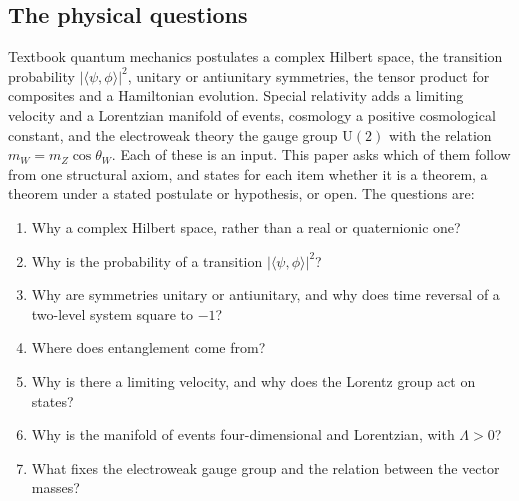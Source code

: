 \documentclass[aps,pra,onecolumn,superscriptaddress,nofootinbib,10pt]{revtex4-2}
\theoremstyle{definition}
\theoremstyle{remark}
\newcommand{\ip}[2]{\langle #1,#2\rangle}
\newcommand{\U}{\mathrm{U}}
\begin{document}
\subsection{The physical questions}
Textbook quantum mechanics postulates a complex Hilbert space, the transition probability
$\lvert\ip{\psi}{\phi}\rvert^2$, unitary or antiunitary symmetries, the tensor product for composites
and a Hamiltonian evolution.  Special relativity adds a limiting velocity and a Lorentzian manifold
of events, cosmology a positive cosmological constant, and the electroweak theory the gauge group
$\U(2)$ with the relation $m_W=m_Z\cos\theta_W$.  Each of these is an input.  This paper asks which of
them follow from one structural axiom, and states for each item whether it is a theorem, a theorem
under a stated postulate or hypothesis, or open.  The questions are:
\begin{enumerate}[label=(Q\arabic*),leftmargin=3em]
\item Why a complex Hilbert space, rather than a real or quaternionic one?
\item Why is the probability of a transition $\lvert\ip{\psi}{\phi}\rvert^2$?
\item Why are symmetries unitary or antiunitary, and why does time reversal of a two-level system
square to $-1$?
\item Where does entanglement come from?
\item Why is there a limiting velocity, and why does the Lorentz group act on states?
\item Why is the manifold of events four-dimensional and Lorentzian, with $\Lambda>0$?
\item What fixes the electroweak gauge group and the relation between the vector masses?
\end{enumerate}
\end{document}
